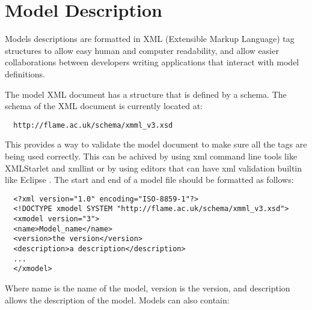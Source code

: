 \section{Model Description}
\label{sec:model_description}

Models descriptions are formatted in XML (Extensible Markup Language) tag
structures to allow easy human and computer readability, and allow easier collaborations between
developers writing applications that interact with model definitions.

The model XML document has a structure that is defined by a schema.
The schema of the XML document is currently located
at:

\begin{verbatim}
  http://flame.ac.uk/schema/xmml_v3.xsd
\end{verbatim}

This provides a way to validate the model document to make sure all the tags are
being used correctly. This can be achived by using xml command line tools like
XMLStarlet \cite{xmlstarlet} and xmllint \cite{xmllint} or by using editors that
can have xml validation builtin like Eclipse \cite{eclipse}. The start and end
of a model file should be formatted as follows:

\begin{verbatim}
  <?xml version="1.0" encoding="ISO-8859-1"?>
  <!DOCTYPE xmodel SYSTEM "http://flame.ac.uk/schema/xmml_v3.xsd">
  <xmodel version="3">
  <name>Model_name</name>
  <version>the version</version>
  <description>a description</description>
  ...
  </xmodel>
\end{verbatim}

Where name is the name of the model, version is the version, and description
allows the description of the model. Models can also contain:

